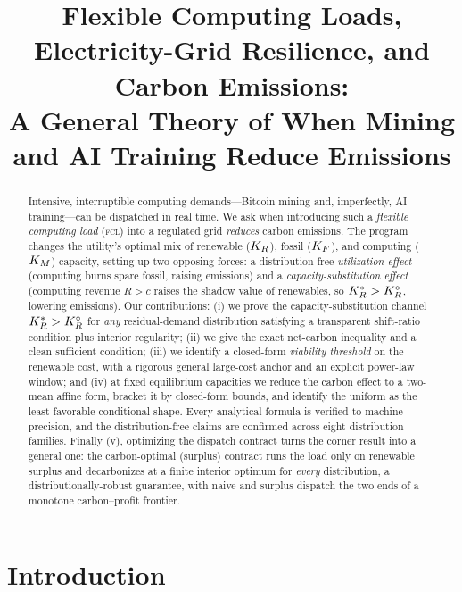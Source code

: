 \title[Flexible Computing Loads, Grid Resilience, and Carbon Emissions]
{Flexible Computing Loads, Electricity-Grid Resilience, and Carbon Emissions:\\
A General Theory of When Mining and AI Training Reduce Emissions}



\begin{abstract}
Intensive, interruptible computing demands---Bitcoin mining and, imperfectly, AI
training---can be dispatched in real time. We ask when introducing such a
\emph{flexible computing load} (\textsc{fcl}) into a regulated grid \emph{reduces}
carbon emissions. The program changes the utility's optimal mix of renewable
($K_R$), fossil ($K_F$), and computing ($K_M$) capacity, setting up two opposing
forces: a distribution-free \emph{utilization effect} (computing burns spare
fossil, raising emissions) and a \emph{capacity-substitution effect} (computing
revenue $R>c$ raises the shadow value of renewables, so $K_R^{*}>K_R^{\circ}$, lowering
emissions). Our contributions: (i) we prove the capacity-substitution channel
$K_R^{*}>K_R^{\circ}$ for \emph{any} residual-demand distribution satisfying a transparent
shift-ratio condition plus interior regularity; (ii) we give the exact net-carbon
inequality and a clean sufficient condition; (iii) we identify a closed-form
\emph{viability threshold} on the renewable cost, with a rigorous general
large-cost anchor and an explicit power-law window; and (iv) at fixed equilibrium
capacities we reduce the carbon effect to a two-mean affine form, bracket it by
closed-form bounds, and identify the uniform as the least-favorable conditional
shape. Every analytical formula is verified to machine precision, and the
distribution-free claims are confirmed across eight distribution families. Finally
(v), optimizing the dispatch contract turns the corner result into a general one: the
carbon-optimal (surplus) contract runs the load only on renewable surplus and
decarbonizes at a finite interior optimum for \emph{every} distribution, a
distributionally-robust guarantee, with naive and surplus dispatch the two ends of a
monotone carbon--profit frontier.
\end{abstract}



\section{Introduction}\label{intg-sec:intro}


